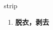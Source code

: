 
\begin{frame}
{\huge strip}
\begin{center}
\begin{enumerate}\Large
  \item \textbf{脱衣，剥去}
\end{enumerate}
\end{center}
\end{frame}
